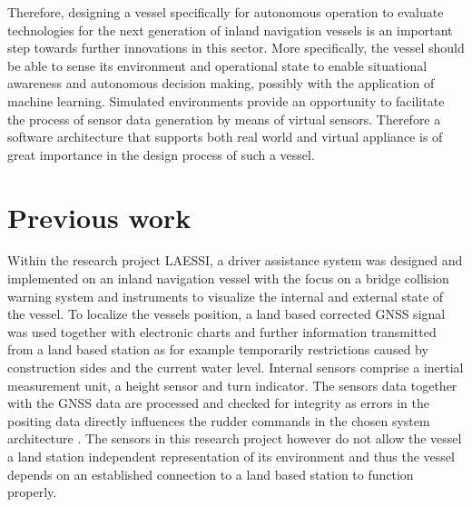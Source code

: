 Therefore, designing a vessel specifically for autonomous operation to evaluate technologies for the next generation of inland navigation vessels is an important step towards further innovations in this sector. More specifically, the vessel should be able to sense its environment and operational state to enable situational awareness and autonomous decision making, possibly with the application of machine learning. Simulated environments provide an opportunity to facilitate the process of sensor data generation by means of virtual sensors. Therefore a software architecture that supports both real world and virtual appliance is of great importance in the design process of such a vessel.  


 \section{Previous work}\label{previous}
  
 Within the research project \ac{LAESSI}, a driver assistance system was designed and implemented on an inland navigation vessel with the focus on a bridge collision warning system and instruments to visualize the internal and external state of the vessel. To localize the vessels position, a land based corrected \ac{GNSS} signal was used together with electronic charts and further information transmitted from a land based station as for example temporarily restrictions caused by construction sides and the current water level. Internal sensors comprise a inertial measurement unit, a height sensor and turn indicator. The sensors data together with the \ac{GNSS} data are processed and checked for integrity as errors in the positing data directly influences the rudder commands in the chosen system architecture \cite{LAESSI}. The sensors in this research project however do not allow the vessel a land station independent representation of its environment and thus the vessel depends on an established connection to a land based station to function properly.\\
 
